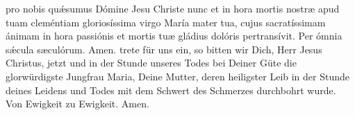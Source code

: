 \documentclass[fontsize=10pt,paper=A5,twoside,BCOR=1mm,DIV=21,headinclude]{scrarticle}
\begin{document}
\vspace{.3em}

\begin{paracol}{2}\pcb
{} pro nobis qu\'æsumus Dómine Jesu Christe nunc et in hora mortis nostræ apud tuam cleméntiam gloriosíssima virgo María mater tua, cujus sacratíssimam ánimam in hora passiónis et mortis tuæ gládius dolóris pertransívit. Per ómnia s\'æcula sæculórum. \R Amen.
	\switchcolumn
	 trete für uns ein, so bitten wir Dich, Herr Jesus Christus, jetzt und in der Stunde unseres Todes bei Deiner Güte die glorwürdigste Jungfrau Maria, Deine Mutter, deren heiligster Leib in der Stunde deines Leidens und Todes mit dem Schwert des Schmerzes durchbohrt wurde. Von Ewigkeit zu Ewigkeit. \R Amen.
\end{paracol}

\pagebreak 




\vspace{.5em}
\end{document}
